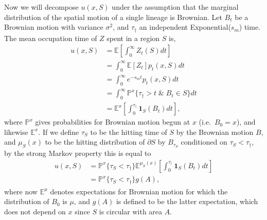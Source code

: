 \documentclass{article}
\renewcommand{\P}{\mathbb{P}}
\newcommand{\E}{\mathbb{E}}
\newcommand{\one}{\mathbf{1}}
\begin{document}
Now we will decompose $u(x,S)$ under the assumption that 
the marginal distribution of the spatial motion of a single lineage is Brownian.
Let $B_t$ be a Brownian motion with variance $\sigma^2$, 
and $\tau_\dagger$ an independent Exponential($s_m$) time.
The mean occupation time of $Z$ spent in a region $S$ is,
\begin{align}
    u(x,S) &= \E\left[\int_0^\infty Z_t(S) dt \right] \\
           &= \int_0^\infty \E[Z_t] p_t(x,S) dt \\
        &= \int_0^\infty e^{-s_m t} p_t(x,S) dt \\
        &= \int_0^\infty \P^x\{ \tau_\dagger > t \; \& \; B_t \in S \} dt \\
        &= \E^x\left[ \int_0^{\tau_\dagger} \one_S(B_t) dt \right]  ,
\end{align}
where $\P^x$ gives probabilities for Brownian motion begun at $x$ (i.e.\ $B_0=x$),
and likewise $\E^x$.
If we define
$\tau_S$ to be the hitting time of $S$ by the Brownian motion $B$,
and $\mu_S(x)$ to be the hitting distribution of $\partial S$ by $B_{\tau_S}$ conditioned on $\tau_S < \tau_\dagger$,
by the strong Markov property this is equal to
\begin{align}
    u(x,S) %
           &= \P^x\{ \tau_S < \tau_\dagger \}  \E^{\mu_S(x)}\left[ \int_0^{\tau_\dagger} \one_S(B_t) dt \right] \\
           &= \P^x\{ \tau_S < \tau_\dagger \}  g(A)  ,
\end{align}
where now $\E^\mu$ denotes expectations for Brownian motion for which the distribution of $B_0$ is $\mu$, 
and $g(A)$ is defined to be the latter expectation,
which does not depend on $x$ since $S$ is circular with area $A$.
\end{document}
